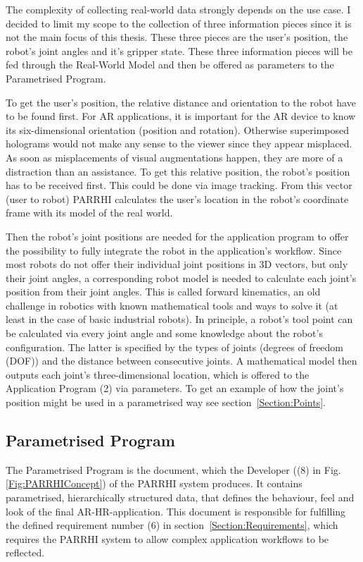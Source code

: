 The complexity of collecting real-world data strongly depends on the use case. I decided to limit my scope to the collection of three information pieces since it is not the main focus of this thesis. These three pieces are the user's position, the robot's joint angles and it's gripper state. These three information pieces will be fed through the Real-World Model and then be offered as parameters to the Parametrised Program.

To get the user's position, the relative distance and orientation to the robot have to be found first. For AR applications, it is important for the AR device to know its six-dimensional orientation (position and rotation). Otherwise superimposed holograms would not make any sense to the viewer since they appear misplaced. As soon as misplacements of visual augmentations happen, they are more of a distraction than an assistance. To get this relative position, the robot's position has to be received first. This could be done via image tracking. From this vector (user to robot) PARRHI calculates the user's location in the robot's coordinate frame with its model of the real world.

Then the robot's joint positions are needed for the application program to offer the possibility to fully integrate the robot in the application's workflow. Since most robots do not offer their individual joint positions in 3D vectors, but only their joint angles, a corresponding robot model is needed to calculate each joint's position from their joint angles. This is called forward kinematics, an old challenge in robotics with known mathematical tools and ways to solve it (at least in the case of basic industrial robots). In principle, a robot's tool point can be calculated via every joint angle and some knowledge about the robot's configuration. The latter is specified by the types of joints (degrees of freedom (DOF)) and the distance between consecutive joints. A mathematical model then outputs each joint's three-dimensional location, which is offered to the Application Program (2) via parameters. To get an example of how the joint's position might be used in a parametrised way see section~\ref{Section:Points}.

\subsection{Parametrised Program}
\label{Section:ParametrisedProgram}
The Parametrised Program is the document, which the Developer ((8) in Fig. \ref{Fig:PARRHIConcept}) of the PARRHI system produces. It contains parametrised, hierarchically structured data, that defines the behaviour, feel and look of the final AR-HR-application. This document is responsible for fulfilling the defined requirement number (6) in section~\ref{Section:Requirements}, which requires the PARRHI system to allow complex application workflows to be reflected.

